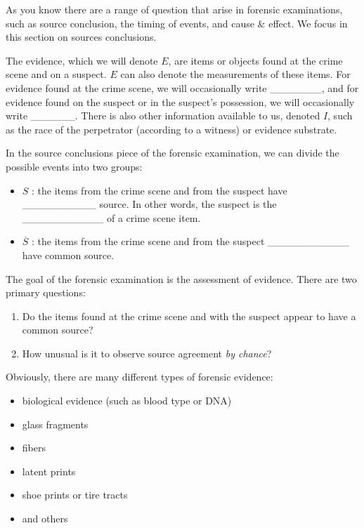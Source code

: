 \documentclass[]{book}
\providecommand{\tightlist}{%
  \setlength{\itemsep}{0pt}\setlength{\parskip}{0pt}}
\theoremstyle{definition}
\theoremstyle{definition}
\theoremstyle{remark}
\begin{document}
As you know there are a range of question that arise in forensic
examinations, such as source conclusion, the timing of events, and cause
\& effect. We focus in this section on sources conclusions.

The evidence, which we will denote \(E\), are items or objects found at
the crime scene and on a suspect. \(E\) can also denote the measurements
of these items. For evidence found at the crime scene, we will
occasionally write \_\_\_\_\_\_\_, and for evidence found on the suspect
or in the suspect's possession, we will occasionally write \_\_\_\_\_\_.
There is also other information available to us, denoted \(I\), such as
the race of the perpetrator (according to a witness) or evidence
substrate.

In the source conclusions piece of the forensic examination, we can
divide the possible events into two groups:

\begin{itemize}
\tightlist
\item
  \(S\) : the items from the crime scene and from the suspect have
  \_\_\_\_\_\_\_\_\_\_ source. In other words, the suspect is the
  \_\_\_\_\_\_\_\_\_\_\_ of a crime scene item. \vspace{.1in}
\item
  \(\overline{S}\) : the items from the crime scene and from the suspect
  \_\_\_\_\_\_\_\_\_\_\_ have common source.
\end{itemize}

The goal of the forensic examination is the assessment of evidence.
There are two primary questions:

\begin{enumerate}
\def\labelenumi{\arabic{enumi}.}
\tightlist
\item
  Do the items found at the crime scene and with the suspect appear to
  have a common source?
\item
  How unusual is it to observe source agreement \emph{by chance}?
\end{enumerate}

Obviously, there are many different types of forensic evidence:

\begin{itemize}
\tightlist
\item
  biological evidence (such as blood type or DNA)
\item
  glass fragments
\item
  fibers
\item
  latent prints
\item
  shoe prints or tire tracts
\item
  and others
\end{itemize}
\end{document}
